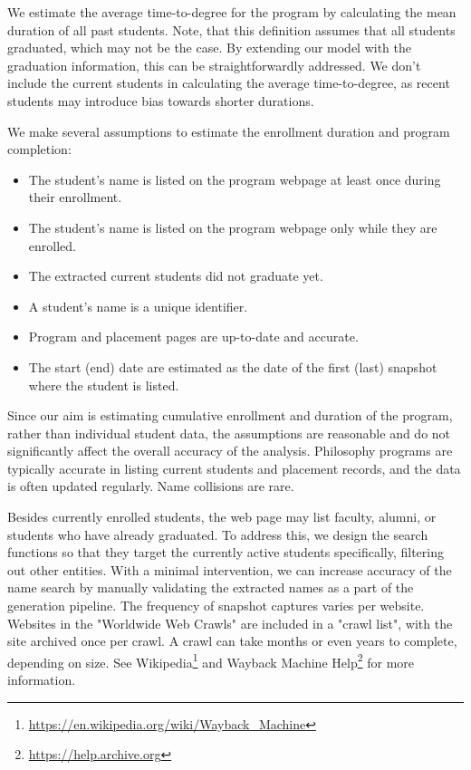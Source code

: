 \documentclass[11pt]{article}
\begin{document}
We estimate the average time-to-degree for the program by calculating the mean duration of all past students.
Note, that this definition assumes that all students graduated, which may not be the case.
By extending our model with the graduation information, this can be straightforwardly addressed.
We don't include the current students in calculating the average time-to-degree, as recent students may introduce bias towards shorter durations.

We make several assumptions to estimate the enrollment duration and program completion:
\begin{itemize}
\item The student's name is listed on the program webpage at least once during their enrollment.
\item The student's name is listed on the program webpage only while they are enrolled.
\item The extracted current students did not graduate yet.
\item A student's name is a unique identifier.
\item Program and placement pages are up-to-date and accurate.
\item The start (end) date are estimated as the date of the first (last) snapshot where the student is listed.
\end{itemize}

Since our aim is estimating cumulative enrollment and duration of the program, rather than individual student data, the assumptions are reasonable and do not significantly affect the overall accuracy of the analysis.
Philosophy programs are typically accurate in listing current students and placement records, and the data is often updated regularly.
Name collisions are rare.

Besides currently enrolled students, the web page may list faculty, alumni, or students who have already graduated.
To address this, we design the search functions so that they target the currently active students specifically, filtering out other entities.
With a minimal intervention, we can increase accuracy of the name search by manually validating the extracted names as a part of the generation pipeline.
%
The frequency of snapshot captures varies per website.
Websites in the "Worldwide Web Crawls" are included in a "crawl list", with the site archived once per crawl. A crawl can take months or even years to complete, depending on size.
See Wikipedia\footnote{\url{https://en.wikipedia.org/wiki/Wayback\_Machine}} and Wayback Machine Help\footnote{\url{https://help.archive.org}} for more information.
\end{document}
